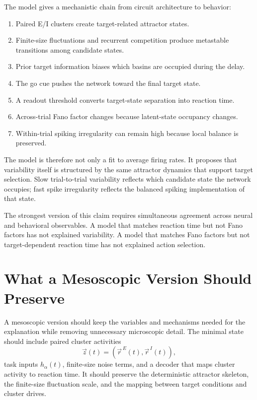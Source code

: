 The model gives a mechanistic chain from circuit architecture to behavior:
%
\begin{enumerate}[leftmargin=*]
  \item Paired E/I clusters create target-related attractor states.
  \item Finite-size fluctuations and recurrent competition produce metastable transitions among candidate states.
  \item Prior target information biases which basins are occupied during the delay.
  \item The go cue pushes the network toward the final target state.
  \item A readout threshold converts target-state separation into reaction time.
  \item Across-trial Fano factor changes because latent-state occupancy changes.
  \item Within-trial spiking irregularity can remain high because local balance is preserved.
\end{enumerate}

The model is therefore not only a fit to average firing rates. It proposes that variability itself is structured by the same attractor dynamics that support target selection. Slow trial-to-trial variability reflects which candidate state the network occupies; fast spike irregularity reflects the balanced spiking implementation of that state.

The strongest version of this claim requires simultaneous agreement across neural and behavioral observables. A model that matches reaction time but not Fano factors has not explained variability. A model that matches Fano factors but not target-dependent reaction time has not explained action selection.

\section{What a Mesoscopic Version Should Preserve}
\label{sec:what-mesoscopic-version-should-preserve}

A mesoscopic version should keep the variables and mechanisms needed for the explanation while removing unnecessary microscopic detail. The minimal state should include paired cluster activities
%
\begin{equation}
  \vec z(t)=
  (\vec r^{\,E}(t),\vec r^{\,I}(t)),
  \label{eq:mesoscopic-state-preserve-ch13}
\end{equation}
%
task inputs $h_{\alpha}(t)$, finite-size noise terms, and a decoder that maps cluster activity to reaction time. It should preserve the deterministic attractor skeleton, the finite-size fluctuation scale, and the mapping between target conditions and cluster drives.

